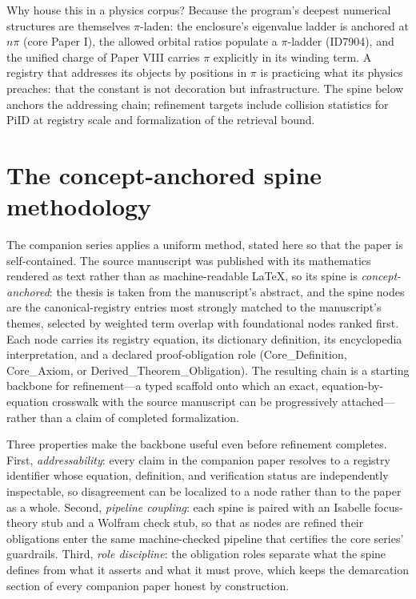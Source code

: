 \documentclass[11pt]{article}
\theoremstyle{remark}
\begin{document}
Why house this in a physics corpus? Because the program's deepest numerical structures are themselves $\pi$-laden: the enclosure's eigenvalue ladder is anchored at $n\pi$ (core Paper I), the allowed orbital ratios populate a $\pi$-ladder (ID7904), and the unified charge of Paper VIII carries $\pi$ explicitly in its winding term. A registry that addresses its objects by positions in $\pi$ is practicing what its physics preaches: that the constant is not decoration but infrastructure. The spine below anchors the addressing chain; refinement targets include collision statistics for PiID at registry scale and formalization of the retrieval bound.

\section{The concept-anchored spine methodology}
\label{sec:method}

The companion series applies a uniform method, stated here so that the paper is self-contained. The source manuscript was published with its mathematics rendered as text rather than as machine-readable LaTeX, so its spine is \emph{concept-anchored}: the thesis is taken from the manuscript's abstract, and the spine nodes are the canonical-registry entries most strongly matched to the manuscript's themes, selected by weighted term overlap with foundational nodes ranked first. Each node carries its registry equation, its dictionary definition, its encyclopedia interpretation, and a declared proof-obligation role (Core\_Definition, Core\_Axiom, or Derived\_Theorem\_Obligation). The resulting chain is a starting backbone for refinement---a typed scaffold onto which an exact, equation-by-equation crosswalk with the source manuscript can be progressively attached---rather than a claim of completed formalization.

Three properties make the backbone useful even before refinement completes. First, \emph{addressability}: every claim in the companion paper resolves to a registry identifier whose equation, definition, and verification status are independently inspectable, so disagreement can be localized to a node rather than to the paper as a whole. Second, \emph{pipeline coupling}: each spine is paired with an Isabelle focus-theory stub and a Wolfram check stub, so that as nodes are refined their obligations enter the same machine-checked pipeline that certifies the core series' guardrails. Third, \emph{role discipline}: the obligation roles separate what the spine defines from what it asserts and what it must prove, which keeps the demarcation section of every companion paper honest by construction.
\end{document}
